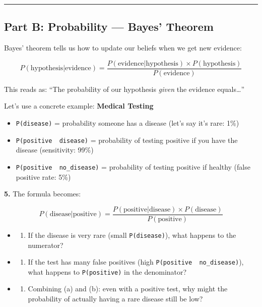 \documentclass[
  11pt,
]{article}
\providecommand{\tightlist}{%
  \setlength{\itemsep}{0pt}\setlength{\parskip}{0pt}}
\begin{document}
\begin{center}\rule{0.5\linewidth}{0.5pt}\end{center}

\hypertarget{part-b-probability-bayes-theorem}{%
\subsection{Part B: Probability --- Bayes'
Theorem}\label{part-b-probability-bayes-theorem}}

Bayes' theorem tells us how to update our beliefs when we get new
evidence:

\[P(\text{hypothesis} | \text{evidence}) = \dfrac{P(\text{evidence} | \text{hypothesis}) \times P(\text{hypothesis})}{P(\text{evidence})}\]

This reads as: ``The probability of our hypothesis \emph{given} the
evidence equals\ldots{}''

Let's use a concrete example: \textbf{Medical Testing}

\begin{itemize}
\tightlist
\item
  \texttt{P(disease)} = probability someone has a disease (let's say
  it's rare: 1\%)
\item
  \texttt{P(positive\ \textbar{}\ disease)} = probability of testing
  positive if you have the disease (sensitivity: 99\%)
\item
  \texttt{P(positive\ \textbar{}\ no\_disease)} = probability of testing
  positive if healthy (false positive rate: 5\%)
\end{itemize}

\textbf{5.} The formula becomes:

\[P(\text{disease} | \text{positive}) = \dfrac{P(\text{positive} | \text{disease}) \times P(\text{disease})}{P(\text{positive})}\]

\begin{itemize}
\item
  \begin{enumerate}
  \def\labelenumi{(\alph{enumi})}
  \tightlist
  \item
    If the disease is very rare (small \texttt{P(disease)}), what
    happens to the numerator?
  \end{enumerate}
\item
  \begin{enumerate}
  \def\labelenumi{(\alph{enumi})}
  \setcounter{enumi}{1}
  \tightlist
  \item
    If the test has many false positives (high
    \texttt{P(positive\ \textbar{}\ no\_disease)}), what happens to
    \texttt{P(positive)} in the denominator?
  \end{enumerate}
\item
  \begin{enumerate}
  \def\labelenumi{(\alph{enumi})}
  \setcounter{enumi}{2}
  \tightlist
  \item
    Combining (a) and (b): even with a positive test, why might the
    probability of actually having a rare disease still be low?
  \end{enumerate}
\end{itemize}
\end{document}
